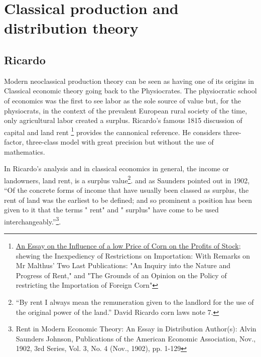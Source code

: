 \section{Classical production and distribution theory}


 \subsection{Ricardo}



Modern neoclassical production theory can be seen as having one of its origins in  Classical economic theory going back to the Physiocrates. The physiocratic school of economics was the first to see labor as the sole source of value but, for the physiocrats, in the context of the prevalent European rural society of the time, only agricultural labor created a surplus. Ricardo's famous 1815 discussion of capital and  land rent \footnote{\href{http://la.utexas.edu/users/hcleaver/368/368RicardoOnCornLaws.html}{An Essay on the Influence of a low Price of Corn on the Profits of Stock}; shewing the Inexpediency of Restrictions on Importation: With Remarks on Mr Malthus' Two Last Publications: "An Inquiry into the Nature and Progress of Rent," and "The Grounds of an Opinion on the Policy of restricting the Importation of Foreign Corn" } 
provides the cannonical reference. He considers three-factor, three-class model with great precision but without the use of mathematics.   

In Ricardo's analysis and in classical economics in general, the income or landowners, land rent, is a surplus value\footnote{``By rent I always mean the remuneration given to the landlord for the use of the original power of the land.'' David Ricardo corn laws note 7.}. 
and as Saunders pointed out in 1902, ``Of the concrete forms of income that have usually been classed as surplus, the rent of land was the earliest to be defined; and so prominent a position has been given to it that the terms " rent" and " surplus" have come to be used interchangeably.''\footnote{Rent in Modern Economic Theory: An Essay in Distribution Author(s): Alvin Saunders Johnson, Publications of the American Economic Association, Nov., 1902, 3rd Series, Vol. 3, No. 4 (Nov., 1902), pp. 1-129}. 


